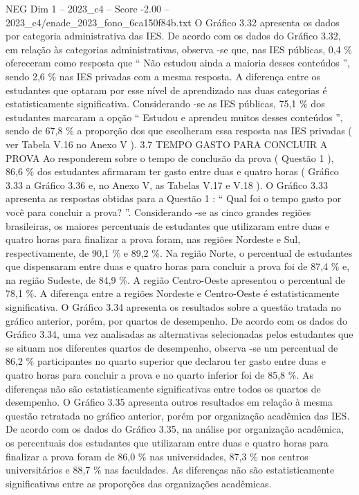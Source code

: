 \begin{textsample}{NEG Dim 1 – 2023\_c4 – Score -2.00 – 2023\_c4/enade\_2023\_fono\_6ca150f84b.txt}
O Gráfico 3.32 apresenta os dados por categoria administrativa das IES.
De acordo com os dados do Gráfico 3.32, em relação às categorias administrativas, observa -se que, nas IES públicas, 0,4 \% ofereceram como resposta que “ Não estudou ainda a maioria desses conteúdos ”, sendo 2,6 \% nas IES privadas com a mesma resposta.
A diferença entre os estudantes que optaram por esse nível de aprendizado nas duas categorias é estatisticamente significativa.
Considerando -se as IES públicas, 75,1 \% dos estudantes marcaram a opção “ Estudou e aprendeu muitos desses conteúdos ”, sendo de 67,8 \% a proporção dos que escolheram essa resposta nas IES privadas ( ver Tabela V.16 no Anexo V ). 3.7 TEMPO GASTO PARA CONCLUIR A PROVA Ao responderem sobre o tempo de conclusão da prova ( Questão 1 ), 86,6 \% dos estudantes afirmaram ter gasto entre duas e quatro horas ( Gráfico 3.33 a Gráfico 3.36 e, no Anexo V, as Tabelas V.17 e V.18 ).
O Gráfico 3.33 apresenta as respostas obtidas para a Questão 1 : “ Qual foi o tempo gasto por você para concluir a prova? ”.
Considerando -se as cinco grandes regiões brasileiras, os maiores percentuais de estudantes que utilizaram entre duas e quatro horas para finalizar a prova foram, nas regiões Nordeste e Sul, respectivamente, de 90,1 \% e 89,2 \%.
Na região Norte, o percentual de estudantes que dispensaram entre duas e quatro horas para concluir a prova foi de 87,4 \% e, na região Sudeste, de 84,9 \%.
A região Centro-Oeste apresentou o percentual de 78,1 \%.
A diferença entre a regiões Nordeste e Centro-Oeste é estatisticamente significativa.
O Gráfico 3.34 apresenta os resultados sobre a questão tratada no gráfico anterior, porém, por quartos de desempenho.
De acordo com os dados do Gráfico 3.34, uma vez analisadas as alternativas selecionadas pelos estudantes que se situam nos diferentes quartos de desempenho, observa -se um percentual de 86,2 \% participantes no quarto superior que declarou ter gasto entre duas e quatro horas para concluir a prova e no quarto inferior foi de 85,8 \%.
As diferenças não são estatisticamente significativas entre todos os quartos de desempenho.
O Gráfico 3.35 apresenta outros resultados em relação à mesma questão retratada no gráfico anterior, porém por organização acadêmica das IES.
De acordo com os dados do Gráfico 3.35, na análise por organização acadêmica, os percentuais dos estudantes que utilizaram entre duas e quatro horas para finalizar a prova foram de 86,0 \% nas universidades, 87,3 \% nos centros universitários e 88,7 \% nas faculdades.
As diferenças não são estatisticamente significativas entre as proporções das organizações acadêmicas.

\end{textsample}
